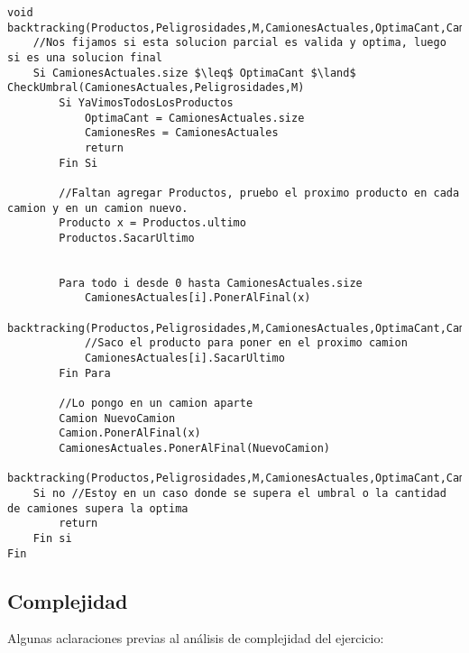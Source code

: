 \begin{lstlisting}[mathescape]
void backtracking(Productos,Peligrosidades,M,CamionesActuales,OptimaCant,CamionesRes)
	//Nos fijamos si esta solucion parcial es valida y optima, luego si es una solucion final
	Si CamionesActuales.size $\leq$ OptimaCant $\land$ CheckUmbral(CamionesActuales,Peligrosidades,M)
		Si YaVimosTodosLosProductos
			OptimaCant = CamionesActuales.size
			CamionesRes = CamionesActuales
			return
		Fin Si
		
		//Faltan agregar Productos, pruebo el proximo producto en cada camion y en un camion nuevo.
		Producto x = Productos.ultimo
		Productos.SacarUltimo


		Para todo i desde 0 hasta CamionesActuales.size
			CamionesActuales[i].PonerAlFinal(x)
			backtracking(Productos,Peligrosidades,M,CamionesActuales,OptimaCant,CamionesRes)
			//Saco el producto para poner en el proximo camion
			CamionesActuales[i].SacarUltimo
		Fin Para
		
		//Lo pongo en un camion aparte
		Camion NuevoCamion
		Camion.PonerAlFinal(x)
		CamionesActuales.PonerAlFinal(NuevoCamion)
		backtracking(Productos,Peligrosidades,M,CamionesActuales,OptimaCant,CamionesRes)
	Si no //Estoy en un caso donde se supera el umbral o la cantidad de camiones supera la optima
		return
	Fin si
Fin
\end{lstlisting}

\newpage
\subsection{Complejidad}

Algunas aclaraciones previas al análisis de complejidad del ejercicio:

